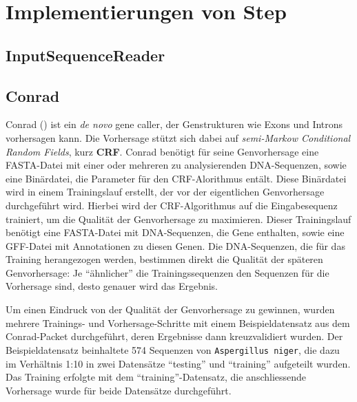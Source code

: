 \section{Implementierungen von Step}
\todo{\dots}

\subsection{InputSequenceReader}

\subsection{Conrad}
Conrad
()
ist ein \textit{de novo} gene caller, der Genstrukturen wie Exons und Introns
vorhersagen kann.
 
Die Vorhersage stützt sich dabei auf \textit{semi-Markow Conditional Random
Fields}, kurz \textbf{CRF}.  %
  
Conrad benötigt für seine Genvorhersage eine FASTA-Datei mit einer oder
mehreren zu analysierenden DNA-Sequenzen, sowie eine Binärdatei, die Parameter
für den CRF-Alorithmus entält.
Diese Binärdatei wird in einem Trainingslauf erstellt, der vor der
eigentlichen Genvorhersage durchgeführt wird. Hierbei wird der CRF-Algorithmus
auf die Eingabesequenz trainiert, um die Qualität der Genvorhersage
zu maximieren. Dieser Trainingslauf benötigt eine FASTA-Datei mit
DNA-Sequenzen, die Gene enthalten, sowie eine GFF-Datei mit Annotationen zu
diesen Genen.
Die DNA-Sequenzen, die für das Training herangezogen werden, bestimmen direkt
die Qualität der späteren Genvorhersage:
Je \enquote{ähnlicher} die Trainingssequenzen den Sequenzen für die
Vorhersage sind, desto genauer wird das Ergebnis.
\citep{doherty_gene_2007}

Um einen Eindruck von der Qualität der Genvorhersage zu gewinnen, wurden
mehrere Trainings- und Vorhersage-Schritte mit einem Beispieldatensatz aus dem
Conrad-Packet durchgeführt, deren Ergebnisse dann kreuzvalidiert wurden.
Der Beispieldatensatz beinhaltete 574 Sequenzen von \texttt{Aspergillus niger},
die dazu im Verhältnis 1:10 in zwei Datensätze \enquote{testing} und
\enquote{training} aufgeteilt wurden. Das Training erfolgte mit dem
\enquote{training}-Datensatz, die anschliessende Vorhersage wurde für beide
Datensätze durchgeführt.

